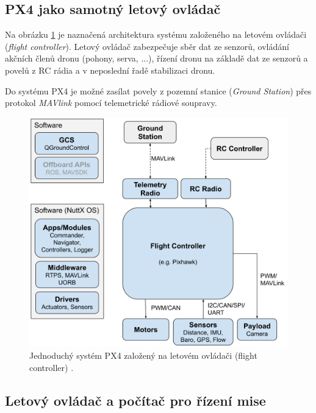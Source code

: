 \subsection{PX4 jako samotný letový ovládač}

Na obrázku \ref{fig:PX4_FC} je naznačená architektura systému založeného na letovém ovládači (\textit{flight controller}). Letový ovládač zabezpečuje sběr dat ze senzorů, ovládání akčních členů dronu (pohony, serva, ...), řízení dronu na základě dat ze senzorů a povelů z RC rádia a v neposlední řadě stabilizaci dronu.

Do systému PX4 je možné zasílat povely z pozemní stanice (\textit{Ground Station}) přes protokol \textit{MAVlink} pomocí telemetrické rádiové soupravy.

\begin{figure}[!ht]
    \begin{center}
        \includegraphics[scale=0.36]{obrazky/PX42}
    \end{center}
    \caption[Jednoduchý systém PX4 založený na letovém ovládači (flight controller)]{Jednoduchý systém PX4 založený na letovém ovládači (flight controller) \cite{PX4main2}.}
    \label{fig:PX4_FC}
\end{figure}

\subsection{Letový ovládač a počítač pro řízení mise}

